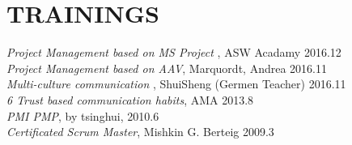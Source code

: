 
\section{TRAININGS}

{\em Project Management based on MS Project }, ASW Acadamy \hfill 2016.12
\\
{\em Project Management based on AAV}, Marquordt, Andrea \hfill 2016.11
\\
{\em Multi-culture communication }, ShuiSheng (Germen Teacher) \hfill 2016.11
\\
{\em 6 Trust based communication habits}, AMA \hfill 2013.8
\\
{\em PMI PMP}, by tsinghui, \hfill 2010.6
\\
{\em Certificated Scrum Master}, Mishkin G. Berteig \hfill 2009.3


